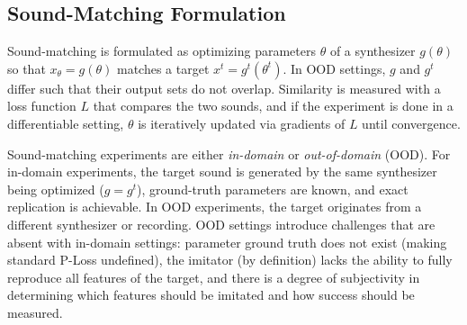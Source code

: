 \documentclass[10pt]{article} %
\begin{document}
\subsection{Sound-Matching Formulation}
\label{sec:sound_matching_formulation}




Sound-matching is formulated as optimizing parameters $\theta$ of a synthesizer $g(\theta)$ so that $x_\theta = g(\theta)$ matches a target $x^t = g^t(\theta^t)$. In OOD settings, $g$ and $g^t$ differ such that their output sets do not overlap. Similarity is measured with a loss function $L$ that compares the two sounds, and if the experiment is done in a differentiable setting, $\theta$ is iteratively updated via gradients of $L$ until convergence.


Sound-matching experiments are either \emph{in-domain} or \emph{out-of-domain} (OOD). For in-domain experiments, the target sound is generated by the same synthesizer being optimized ($g = g^{t}$), ground-truth parameters are known, and exact replication is achievable. In OOD experiments, the target originates from a different synthesizer or recording. OOD settings introduce challenges that are absent with in-domain settings: parameter ground truth does not exist (making standard P-Loss undefined), the imitator (by definition) lacks the ability to fully reproduce all features of the target, and there is a degree of subjectivity in determining which features should be imitated and how success should be measured. 
\end{document}
